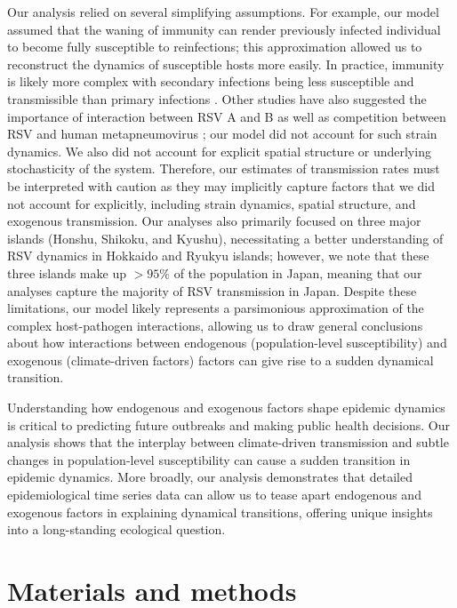 \documentclass[12pt]{article}
\begin{document}
Our analysis relied on several simplifying assumptions.
For example, our model assumed that the waning of immunity can render previously infected individual to become fully susceptible to reinfections; this approximation allowed us to reconstruct the dynamics of susceptible hosts more easily.
In practice, immunity is likely more complex with secondary infections being less susceptible and transmissible than primary infections \citep{pitzer2015environmental}.
Other studies have also suggested the importance of interaction between RSV A and B \citep{white2005transmission,holmdahl2024differential} as well as competition between RSV and human metapneumovirus \citep{bhattacharyya2015cross}; 
our model did not account for such strain dynamics.
We also did not account for explicit spatial structure or underlying stochasticity of the system.
Therefore, our estimates of transmission rates must be interpreted with caution as they may implicitly capture factors that we did not account for explicitly, including strain dynamics, spatial structure, and exogenous transmission.
Our analyses also primarily focused on three major islands (Honshu, Shikoku, and Kyushu), necessitating a better understanding of RSV dynamics in Hokkaido and Ryukyu islands;
however, we note that these three islands make up $>95\%$ of the population in Japan, meaning that our analyses capture the majority of RSV transmission in Japan.
Despite these limitations, our model likely represents a parsimonious approximation of the complex host-pathogen interactions, allowing us to draw general conclusions about how interactions between endogenous (population-level susceptibility) and exogenous (climate-driven factors) factors can give rise to a sudden dynamical transition.

Understanding how endogenous and exogenous factors shape epidemic dynamics is critical to predicting future outbreaks and making public health decisions.
Our analysis shows that the interplay between climate-driven transmission and subtle changes in population-level susceptibility can cause a sudden transition in epidemic dynamics.
More broadly, our analysis demonstrates that detailed epidemiological time series data can allow us to tease apart endogenous and exogenous factors in explaining dynamical transitions, offering unique insights into a long-standing ecological question.

\section*{Materials and methods}
\end{document}
